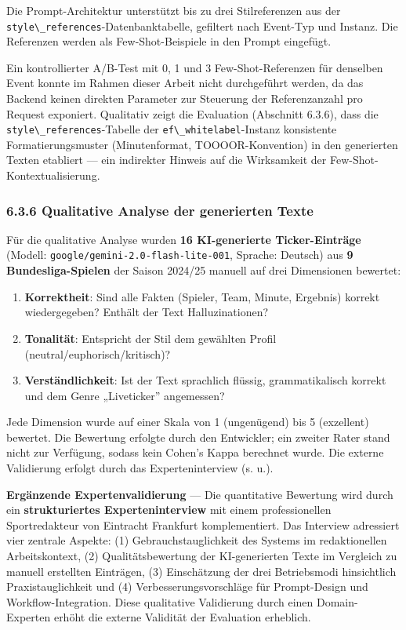 Die Prompt-Architektur unterstützt bis zu drei Stilreferenzen aus der
\passthrough{\lstinline!style\_references!}-Datenbanktabelle, gefiltert
nach Event-Typ und Instanz. Die Referenzen werden als Few-Shot-Beispiele
in den Prompt eingefügt.

Ein kontrollierter A/B-Test mit 0, 1 und 3 Few-Shot-Referenzen für
denselben Event konnte im Rahmen dieser Arbeit nicht durchgeführt
werden, da das Backend keinen direkten Parameter zur Steuerung der
Referenzanzahl pro Request exponiert. Qualitativ zeigt die Evaluation
(Abschnitt 6.3.6), dass die
\passthrough{\lstinline!style\_references!}-Tabelle der
\passthrough{\lstinline!ef\_whitelabel!}-Instanz konsistente
Formatierungsmuster (Minutenformat, TOOOOR-Konvention) in den
generierten Texten etabliert --- ein indirekter Hinweis auf die
Wirksamkeit der Few-Shot-Kontextualisierung.

\subsubsection{6.3.6 Qualitative Analyse der generierten
Texte}\label{qualitative-analyse-der-generierten-texte}

Für die qualitative Analyse wurden \textbf{16 KI-generierte
Ticker-Einträge} (Modell:
\passthrough{\lstinline!google/gemini-2.0-flash-lite-001!}, Sprache:
Deutsch) aus \textbf{9 Bundesliga-Spielen} der Saison 2024/25 manuell
auf drei Dimensionen bewertet:

\begin{enumerate}
\def\labelenumi{\arabic{enumi}.}
\tightlist
\item
  \textbf{Korrektheit}: Sind alle Fakten (Spieler, Team, Minute,
  Ergebnis) korrekt wiedergegeben? Enthält der Text Halluzinationen?
\item
  \textbf{Tonalität}: Entspricht der Stil dem gewählten Profil
  (neutral/euphorisch/kritisch)?
\item
  \textbf{Verständlichkeit}: Ist der Text sprachlich flüssig,
  grammatikalisch korrekt und dem Genre „Liveticker'' angemessen?
\end{enumerate}

Jede Dimension wurde auf einer Skala von 1 (ungenügend) bis 5
(exzellent) bewertet. Die Bewertung erfolgte durch den Entwickler; ein
zweiter Rater stand nicht zur Verfügung, sodass kein Cohen's Kappa
berechnet wurde. Die externe Validierung erfolgt durch das
Experteninterview (s. u.).

\textbf{Ergänzende Expertenvalidierung} --- Die quantitative Bewertung
wird durch ein \textbf{strukturiertes Experteninterview} mit einem
professionellen Sportredakteur von Eintracht Frankfurt komplementiert.
Das Interview adressiert vier zentrale Aspekte: (1)
Gebrauchstauglichkeit des Systems im redaktionellen Arbeitskontext, (2)
Qualitätsbewertung der KI-generierten Texte im Vergleich zu manuell
erstellten Einträgen, (3) Einschätzung der drei Betriebsmodi
hinsichtlich Praxistauglichkeit und (4) Verbesserungsvorschläge für
Prompt-Design und Workflow-Integration. Diese qualitative Validierung
durch einen Domain-Experten erhöht die externe Validität der Evaluation
erheblich.

